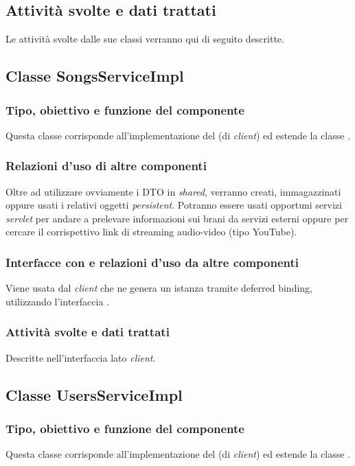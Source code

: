 \subsection*{Attivit\`a svolte e dati trattati}
Le attivit\`a svolte dalle sue classi verranno qui di seguito descritte.

\subsection{Classe SongsServiceImpl}
\subsubsection*{Tipo, obiettivo e funzione del componente}
Questa classe corrisponde all'implementazione del  (di
\emph{client}) ed estende la classe .

\subsubsection*{Relazioni d'uso di altre componenti}
Oltre ad utilizzare ovviamente i DTO in \emph{shared}, verranno creati,
immagazzinati oppure usati i relativi oggetti \emph{persistent}.
Potranno essere usati opportuni servizi \emph{servlet} per andare a prelevare
informazioni sui brani da servizi esterni oppure per cercare il corrispettivo
link di streaming audio-video (tipo YouTube).

\subsubsection*{Interfacce con e relazioni d'uso da altre componenti}
Viene usata dal \emph{client} che ne genera un istanza tramite deferred binding,
utilizzando l'interfaccia .

\subsubsection*{Attivit\`a svolte e dati trattati}
Descritte nell'interfaccia lato \emph{client}.

\subsection{Classe UsersServiceImpl}
\subsubsection*{Tipo, obiettivo e funzione del componente}
Questa classe corrisponde all'implementazione del  (di
\emph{client}) ed estende la classe .

